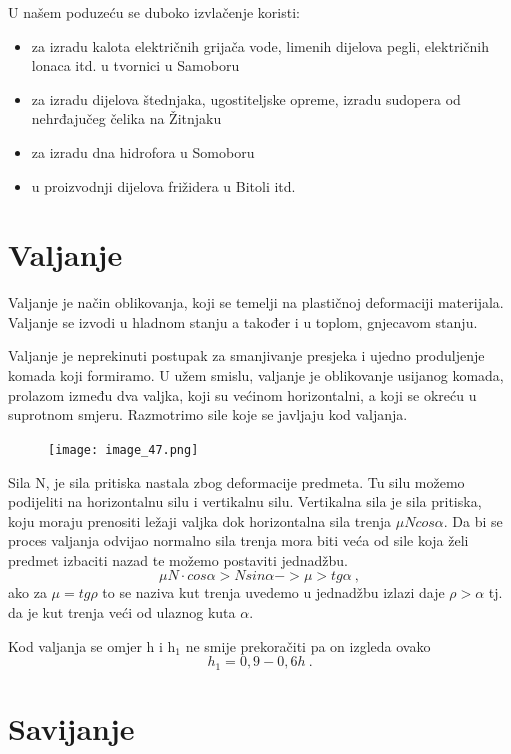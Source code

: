 \documentclass[a4paper,12pt]{article}
\numberwithin{figure}{section}
\begin{document}
U našem poduzeću se duboko izvlačenje koristi:
\begin{itemize}
\item za izradu kalota električnih grijača vode, limenih dijelova pegli, električnih lonaca itd. u tvornici u Samoboru
\item za izradu dijelova štednjaka, ugostiteljske opreme, izradu sudopera od nehrđajučeg čelika na Žitnjaku
\item za izradu dna hidrofora u Somoboru
\item u proizvodnji dijelova frižidera u Bitoli itd.
\end{itemize}
\clearpage
\section{Valjanje}
Valjanje je način oblikovanja, koji se temelji na plastičnoj deformaciji materijala. Valjanje se izvodi u hladnom stanju a također i  u toplom, gnjecavom stanju.\par
Valjanje je neprekinuti postupak za smanjivanje presjeka i ujedno produljenje komada koji formiramo. U užem smislu, valjanje je oblikovanje usijanog komada, prolazom između dva valjka, koji su većinom horizontalni, a koji se okreću u suprotnom smjeru. Razmotrimo sile koje se javljaju kod valjanja.\par
\begin{figure}[!h]
\centering
\texttt{[image: image\_47.png]}
\end{figure}
\FloatBarrier
Sila N, je sila pritiska nastala zbog deformacije predmeta. Tu silu možemo podijeliti na horizontalnu silu i vertikalnu silu. Vertikalna sila je sila pritiska, koju moraju prenositi ležaji valjka dok horizontalna sila trenja $\mu N cos \alpha$. Da bi se proces valjanja odvijao normalno sila trenja mora biti veća od sile koja želi predmet izbaciti nazad te možemo postaviti jednadžbu.
\begin{equation}
\mu N\cdot cos \alpha > N sin \alpha -> \mu > tg \alpha\:,
\end{equation} 
ako za $\mu = tg\rho$ to se naziva kut trenja uvedemo u jednadžbu izlazi daje $\rho>\alpha$ tj. da je kut trenja veći od ulaznog kuta $\alpha$.\par
Kod valjanja se omjer h i h$_{1}$ ne smije prekoračiti pa on izgleda ovako
\begin{equation}
h_{1}=0,9 - 0,6 h\:.
\end{equation}
\clearpage
\section{Savijanje}
\end{document}
